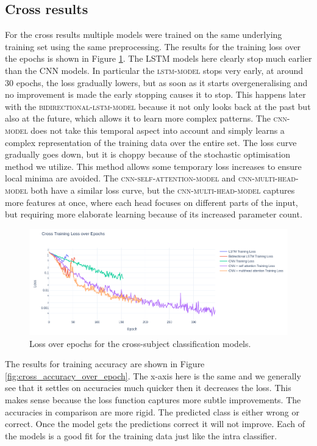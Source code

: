 \documentclass[conference]{IEEEtran}
\begin{document}
\subsection{Cross results}
For the cross results multiple models were trained on the same underlying training set using the same preprocessing. The results for the training loss over the epochs is shown in Figure \ref{fig:cross_loss_over_epoch}. The LSTM models here clearly stop much earlier than the CNN models. In particular the \textsc{lstm-model} stops very early, at around $30$ epochs, the loss gradually lowers, but as soon as it starts overgeneralising and no improvement is made the early stopping causes it to stop. This happens later with the \textsc{bidirectional-lstm-model} because it not only looks back at the past but also at the future, which allows it to learn more complex patterns. The \textsc{cnn-model} does not take this temporal aspect into account and simply learns a complex representation of the training data over the entire set. The loss curve gradually goes down, but it is choppy because of the stochastic optimisation method we utilize. This method allows some temporary loss increases to ensure local minima are avoided.  The \textsc{cnn-self-attention-model} and \textsc{cnn-multi-head-model} both have a similar loss curve, but the \textsc{cnn-multi-head-model} captures more features at once, where each head focuses on different parts of the input, but requiring more elaborate learning because of its increased parameter count.

\begin{figure}[t]
    \centering
    \includegraphics[width=\textwidth]{figures/cross_loss_over_epoch_small.png}
    \caption{Loss over epochs for the cross-subject classification models.}
    \label{fig:cross_loss_over_epoch}
\end{figure}

The results for training accuracy are shown in Figure \ref{fig:cross_accuracy_over_epoch}. The x-axis here is the same and we generally see that it settles on accuracies much quicker then it decreases the loss. This makes sense because the loss function captures more subtle improvements. The accuracies in comparison are more rigid. The predicted class is either wrong or correct. Once the model gets the predictions correct it will not improve. Each of the models is a good fit for the training data just like the intra classifier.
\end{document}
